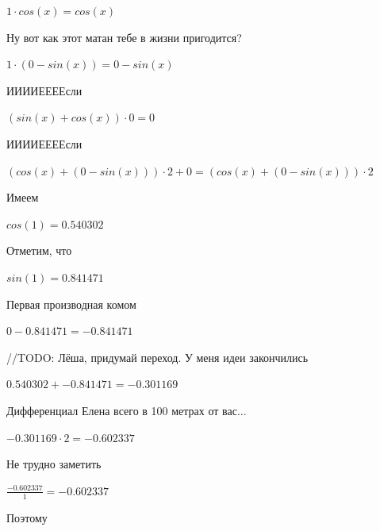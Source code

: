 \documentclass[12pt,a4paper,fleqn]{article}
\begin{document}
\begin{center}
$1 \cdot cos(x) = cos(x)$\end{center}
Ну вот как этот матан тебе в жизни пригодится?

\begin{center}
$1 \cdot (0-sin(x)) = 0-sin(x)$\end{center}
ИИИИЕЕЕЕсли\cite{link3}

\begin{center}
$(sin(x)+cos(x)) \cdot 0 = 0$\end{center}
ИИИИЕЕЕЕсли\cite{link3}

\begin{center}
$(cos(x)+(0-sin(x))) \cdot 2+0 = (cos(x)+(0-sin(x))) \cdot 2$\end{center}
Имеем

\begin{center}
\end{center}
\begin{center}$cos(1) = 0.540302$\end{center}
Отметим, что

\begin{center}
\end{center}
\begin{center}$sin(1) = 0.841471$\end{center}
Первая производная комом\cite{link2}

\begin{center}
\end{center}
\begin{center}$0-0.841471 = -0.841471$\end{center}
//TODO: Лёша, придумай переход. У меня идеи закончились

\begin{center}
\end{center}
\begin{center}$0.540302+-0.841471 = -0.301169$\end{center}
Дифференциал Елена всего в 100 метрах от вас...

\begin{center}
\end{center}
\begin{center}$-0.301169 \cdot 2 = -0.602337$\end{center}
Не трудно заметить

\begin{center}
\end{center}
\begin{center}$\frac{-0.602337}{1} = -0.602337$\end{center}
Поэтому
\end{document}
